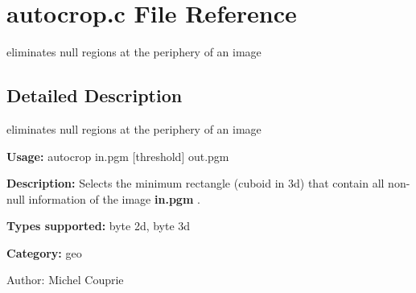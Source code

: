 \section{autocrop.c File Reference}
\label{autocrop_8c}
eliminates null regions at the periphery of an image 



\subsection{Detailed Description}
eliminates null regions at the periphery of an image 

{\bf Usage:} autocrop in.pgm [threshold] out.pgm

{\bf Description:} Selects the minimum rectangle (cuboid in 3d) that contain all non-null information of the image {\bf in.pgm} .

{\bf Types supported:} byte 2d, byte 3d

{\bf Category:} geo

\begin{Desc}
\item[Author:]Michel Couprie \end{Desc}
